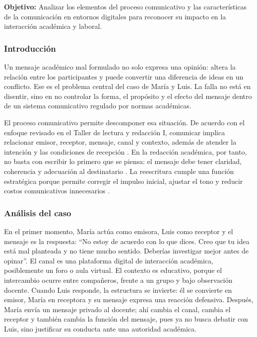 \begin{portafolioabstract}
	\textbf{Objetivo:}
	Analizar los elementos del proceso comunicativo y las características de la comunicación en entornos digitales para reconocer su impacto en la interacción académica y laboral.
\end{portafolioabstract}

\subsubsection{Introducción}

Un mensaje académico mal formulado no solo expresa una opinión: altera la relación entre los participantes y puede convertir una diferencia de ideas en un conflicto. Ese es el problema central del caso de María y Luis. La falla no está en disentir, sino en no controlar la forma, el propósito y el efecto del mensaje dentro de un sistema comunicativo regulado por normas académicas.

El proceso comunicativo permite descomponer esa situación. De acuerdo con el enfoque revisado en el Taller de lectura y redacción I, comunicar implica relacionar emisor, receptor, mensaje, canal y contexto, además de atender la intención y las condiciones de recepción \citep{romero2022taller}. En la redacción académica, por tanto, no basta con escribir lo primero que se piensa: el mensaje debe tener claridad, coherencia y adecuación al destinatario \citep{ayala2005taller}. La reescritura cumple una función estratégica porque permite corregir el impulso inicial, ajustar el tono y reducir costos comunicativos innecesarios \citep{romero2014volver}.

\subsubsection{Análisis del caso}

En el primer momento, María actúa como emisora, Luis como receptor y el mensaje es la respuesta: ``No estoy de acuerdo con lo que dices. Creo que tu idea está mal planteada y no tiene mucho sentido. Deberías investigar mejor antes de opinar''. El canal es una plataforma digital de interacción académica, posiblemente un foro o aula virtual. El contexto es educativo, porque el intercambio ocurre entre compañeros, frente a un grupo y bajo observación docente. Cuando Luis responde, la estructura se invierte: él se convierte en emisor, María en receptora y su mensaje expresa una reacción defensiva. Después, María envía un mensaje privado al docente; ahí cambia el canal, cambia el receptor y también cambia la función del mensaje, pues ya no busca debatir con Luis, sino justificar su conducta ante una autoridad académica.

